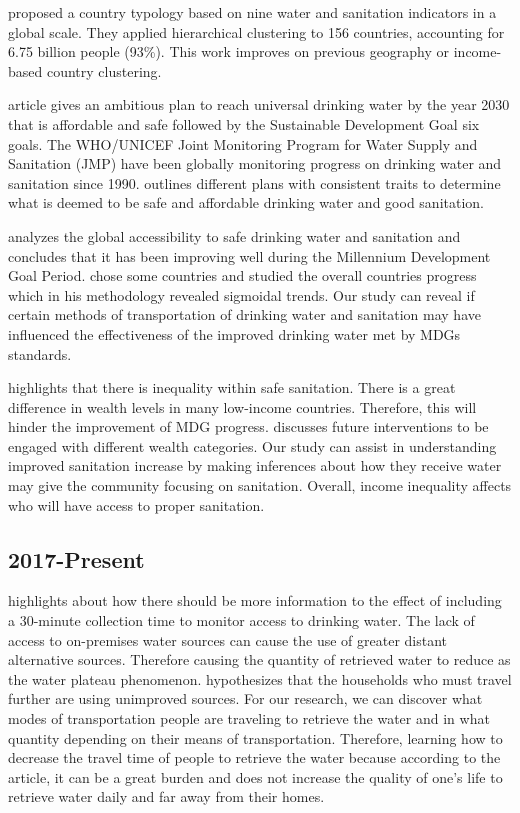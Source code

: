 \documentclass[10pt,twoside]{article}
\numberwithin{equation}{section}
\newcommand{\?}{\stackrel{?}{=}}
\begin{document}
\citet{ondaCountryClusteringApplied2014} proposed a country typology based on nine water and sanitation indicators in a global scale. They applied hierarchical clustering to 156 countries, accounting for 6.75 billion people (93\%). This work improves on previous geography or income-based country clustering. 

\citet{whoDrinkingwater} article gives an ambitious plan to reach universal drinking water by the year 2030 that is
affordable and safe followed by the Sustainable Development Goal six goals. The WHO/UNICEF Joint Monitoring Program for
Water Supply and Sanitation (JMP) have been globally monitoring progress on drinking water and sanitation since 1990. \citet{whoDrinkingwater} outlines different plans with consistent traits to determine what is deemed to be safe and affordable drinking
water and good sanitation. 

\citet{fullerTrackingProgressGlobal2016} analyzes the global accessibility to safe drinking water and sanitation and concludes that
it has been improving well during the Millennium Development Goal Period. \citet{fullerTrackingProgressGlobal2016} chose some countries and studied the overall countries
progress which in his methodology revealed sigmoidal trends. Our study can reveal if certain methods of transportation
of drinking water and sanitation may have influenced the effectiveness of the improved drinking water met by MDGs
standards.

\citet{jiaHighResolutionSpatialDistribution2016} highlights that there is inequality within safe sanitation. There is a great difference in
wealth levels in many low-income countries. Therefore, this will hinder the improvement of MDG
progress. \citet{jiaHighResolutionSpatialDistribution2016}discusses future interventions to be engaged with different wealth
categories. Our study can assist in understanding improved sanitation increase by making inferences about how they
receive water may give the community focusing on sanitation. Overall, income inequality affects who will have access to
proper sanitation.

\subsection{2017-Present}
\citet{cassiviAccessDrinkingWater2018} highlights about how there should be more information to the effect of including a 30-minute
collection time to monitor access to drinking water. The lack of access to on-premises water sources can cause the use
of greater distant alternative sources. Therefore causing the quantity of retrieved water to reduce as the water plateau
phenomenon.\citet{cassiviAccessDrinkingWater2018} hypothesizes that the households who must travel further are using unimproved
sources. For our research, we can discover what modes of transportation people are traveling to retrieve the water and
in what quantity depending on their means of transportation. Therefore, learning how to decrease the travel time of
people to retrieve the water because according to the article, it can be a great burden and does not increase the
quality of one's life to retrieve water daily and far away from their homes.
\end{document}
